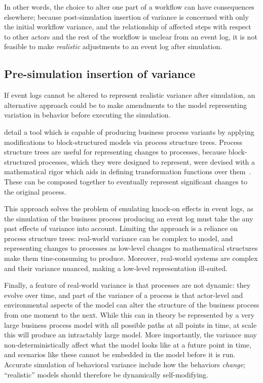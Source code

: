 \documentclass[draft,12pt]{llncs}  %
\begin{document}
In other words, the choice to alter one part of a workflow can have consequences
elsewhere; because post-simulation insertion of variance is concerned with only
the initial workflow variance, and the relationship of affected steps with
respect to other actors and the rest of the workflow is unclear from an event
log, it is not feasible to make \emph{realistic} adjustments to an event log
after simulation.
\par


\subsection{Pre-simulation insertion of variance}
If event logs cannot be altered to represent realistic variance after
simulation, an alternative approach could be to make amendments to the model
representing variation in behavior before executing the simulation.
\par

\cite{pourmasoumi2015business} detail a tool which is capable of producing
business process variants by applying modifications to block-structured models
via process structure trees. Process structure trees are useful for representing
changes to processes, because block-structured processes, which they were
designed to represent, were devised with a mathematical rigor which aids in
defining transformation functions over them~\citep{li2010mining}. These can be composed together to
eventually represent significant changes to the original process.\par

This approach solves the problem of emulating knock-on effects in event logs, as
the simulation of the business process producing an event log must take the any
past effects of variance into account. Limiting the approach is a reliance on
process structure trees: real-world variance can be complex to model, and
representing changes to processes as low-level changes to mathematical
structures make them tine-consuming to produce. Moreover, real-world systems are
complex and their variance nuanced, making a low-level representation
ill-suited.
\par

Finally, a feature of real-world variance is that processes are not dynamic:
they evolve over time, and part of the variance of a process is that actor-level
and environmental aspects of the model can alter the structure of the business
process from one moment to the next. While this can in theory be represented by
a very large business process model with all possible paths at all points in
time, at scale this will produce an intractably large model. More importantly,
the variance may non-deterministically affect what the model looks like at a
future point in time, and scenarios like these cannot be embedded in the model
before it is run. Accurate simulation of behavioral variance include how the
behaviors \emph{change}; ``realistic'' models should therefore be dynamically
self-modifying.
\par
\end{document}
